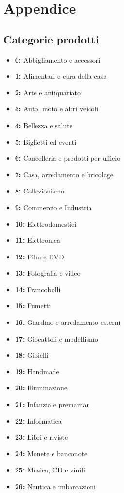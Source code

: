 \chapter{Appendice}
\section{Categorie prodotti}


\begin{itemize}

\item \textbf{0:} Abbigliamento e accessori
\item \textbf{1:} Alimentari e cura della casa
\item \textbf{2:} Arte e antiquariato
\item \textbf{3:} Auto, moto e altri veicoli
\item \textbf{4:} Bellezza e salute
\item \textbf{5:} Biglietti ed eventi
\item \textbf{6:} Cancelleria e prodotti per ufficio
\item \textbf{7:} Casa, arredamento e bricolage
\item \textbf{8:} Collezionismo
\item \textbf{9:} Commercio e Industria
\item \textbf{10:} Elettrodomestici
\item \textbf{11:} Elettronica
\item \textbf{12:} Film e DVD
\item \textbf{13:} Fotografia e video
\item \textbf{14:} Francobolli
\item \textbf{15:} Fumetti
\item \textbf{16:} Giardino e arredamento esterni
\item \textbf{17:} Giocattoli e modellismo
\item \textbf{18:} Gioielli
\item \textbf{19:} Handmade
\item \textbf{20:} Illuminazione
\item \textbf{21:} Infanzia e premaman
\item \textbf{22:} Informatica
\item \textbf{23:} Libri e riviste
\item \textbf{24:} Monete e banconote
\item \textbf{25:} Musica, CD e vinili
\item \textbf{26:} Nautica e imbarcazioni

\end{itemize}
